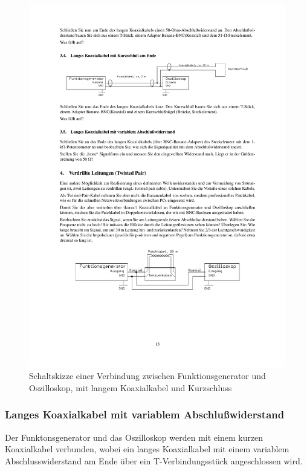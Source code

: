\documentclass[12pt,a4paper]{article}
\begin{document}
\begin{figure}[H] 
  \centering
    \includegraphics[trim = 10mm 220mm 10mm 45mm, clip, scale = 1]{3_4-4.pdf}
  	\caption[Schaltskizze einer Verbindung zwischen Funktionsgenerator und Oszilloskop, mit langem Koaxialkabel und Kurzschluss]{Schaltskizze einer Verbindung zwischen Funktionsgenerator und Oszilloskop, mit langem Koaxialkabel und Kurzschluss\footnotemark}
  \label{fig:3.4}
\end{figure}

\subsubsection{Langes Koaxialkabel mit variablem Abschlußwiderstand}

Der Funktonsgenerator und das Oszilloskop werden mit einem kurzen Koaxialkabel verbunden, wobei ein langes Koaxialkabel mit einem variablem Abschlusswiderstand am Ende über ein T-Verbindungsstück angeschlossen wird.
\end{document}
